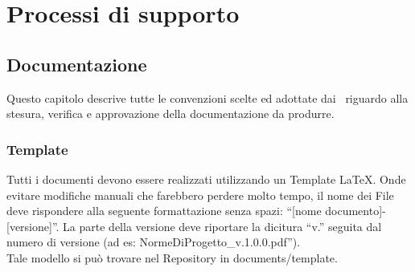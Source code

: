 \section{Processi di supporto}{

\subsection{Documentazione}{
Questo capitolo descrive tutte le convenzioni scelte ed adottate dai \gruppo\ riguardo alla stesura, verifica e approvazione della documentazione da produrre.
\subsubsection{Template} 
		Tutti i documenti devono essere realizzati utilizzando un Template \LaTeX. Onde evitare modifiche manuali che farebbero perdere molto tempo, 
		il nome dei File deve rispondere alla seguente formattazione senza spazi: “[nome documento]-[versione]”. La parte della versione deve riportare la dicitura “v.” seguita dal numero di versione (ad es: NormeDiProgetto\_v.1.0.0.pdf”).\\
 		Tale modello si può trovare nel Repository in documents/template.
	\label{sec:docs}
}}
